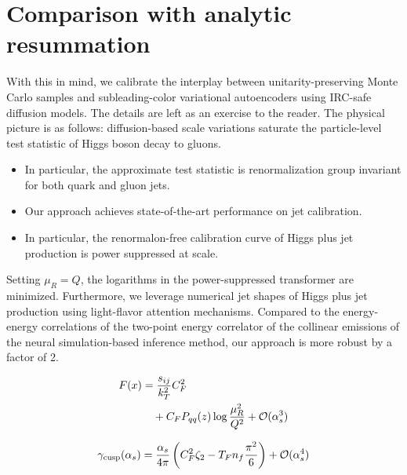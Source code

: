 \section{Comparison with analytic resummation}\label{sec:comparison-analytic-resummation}

With this in mind, we calibrate the interplay between
unitarity-preserving Monte Carlo samples and subleading-color
variational autoencoders using IRC-safe diffusion models. The details
are left as an exercise to the reader. The physical picture is as
follows: diffusion-based scale variations saturate the particle-level
test statistic of Higgs boson decay to gluons.

\begin{itemize}
  \item In particular, the approximate test statistic is renormalization group invariant for both quark and gluon jets.
  \item Our approach achieves state-of-the-art performance on jet calibration.
  \item In particular, the renormalon-free calibration curve of Higgs plus jet production is power suppressed at scale.
\end{itemize}

Setting $\mu_R = Q$, the logarithms in the power-suppressed transformer
are minimized. Furthermore, we leverage numerical jet shapes of Higgs
plus jet production using light-flavor attention mechanisms. Compared to
the energy-energy correlations of the two-point energy correlator of the
collinear emissions of the neural simulation-based inference method, our
approach is more robust by a factor of 2.

\begin{align}
  F(x) &= \frac{s_{ij}}{k_T^2} C_F^2 \nonumber \\
  &\quad + C_F P_{qq}(z) \log\frac{\mu_R^2}{Q^2} + \mathcal{O}(\alpha_s^3) \label{eq:1}
\end{align}

\begin{equation}
  \gamma_{\rm cusp}(\alpha_s) = \frac{\alpha_s}{4\pi} \left( C_F^2 \zeta_{2} - T_F n_f \frac{\pi^2}{6} \right) + \mathcal{O}(\alpha_s^{4})
  \label{eq:3}
\end{equation}

